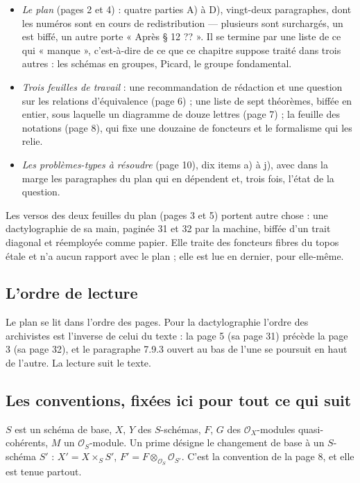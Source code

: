 \documentclass[11pt,a4paper]{article}
\begin{document}
\begin{itemize}
  \item \emph{Le plan} (pages 2 et 4) : quatre parties A) à D), vingt-deux
  paragraphes, dont les numéros sont en cours de redistribution — plusieurs
  sont surchargés, un est biffé, un autre porte « Après § 12 ?? ». Il se
  termine par une liste de ce qui « manque », c'est-à-dire de ce que ce
  chapitre suppose traité dans trois autres : les schémas en groupes, Picard,
  le groupe fondamental.
  \item \emph{Trois feuilles de travail} : une recommandation de rédaction et
  une question sur les relations d'équivalence (page 6) ; une liste de sept
  théorèmes, biffée en entier, sous laquelle un diagramme de douze lettres
  (page 7) ; la feuille des notations (page 8), qui fixe une douzaine de
  foncteurs et le formalisme qui les relie.
  \item \emph{Les problèmes-types à résoudre} (page 10), dix items a) à j),
  avec dans la marge les paragraphes du plan qui en dépendent et, trois fois,
  l'état de la question.
\end{itemize}

Les versos des deux feuilles du plan (pages 3 et 5) portent autre chose : une
dactylographie de sa main, paginée 31 et 32 par la machine, biffée d'un trait
diagonal et réemployée comme papier. Elle traite des foncteurs fibres du topos
étale et n'a aucun rapport avec le plan ; elle est lue en dernier, pour
elle-même.

\subsection*{L'ordre de lecture}

Le plan se lit dans l'ordre des pages. Pour la dactylographie l'ordre des
archivistes est l'inverse de celui du texte : la page 5 (sa page 31) précède
la page 3 (sa page 32), et le paragraphe 7.9.3 ouvert au bas de l'une se
poursuit en haut de l'autre. La lecture suit le texte.

\subsection*{Les conventions, fixées ici pour tout ce qui suit}

$S$ est un schéma de base, $X$, $Y$ des $S$-schémas, $F$, $G$ des
$\mathcal{O}_X$-modules quasi-cohérents, $M$ un $\mathcal{O}_S$-module. Un
prime désigne le changement de base à un $S$-schéma $S'$ : $X' = X \times_S
S'$, $F' = F \otimes_{\mathcal{O}_S} \mathcal{O}_{S'}$. C'est la convention de
la page 8, et elle est tenue partout.
\end{document}
